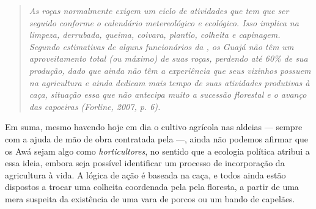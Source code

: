 \begin{quote}
\emph{As roças normalmente exigem um ciclo de atividades que tem que ser
seguido conforme o calendário metereológico e ecológico. Isso implica na
limpeza, derrubada, queima, coivara, plantio, colheita e capinagem.
Segundo estimativas de alguns funcionários da , os Guajá não têm um
aproveitamento total (ou máximo) de suas roças, perdendo até 60\% de sua
produção, dado que ainda não têm a experiência que seus vizinhos possuem
na agricultura e ainda dedicam mais tempo de suas atividades produtivas
à caça, situação essa que não antecipa muito a sucessão florestal e o
avanço das capoeiras (Forline, 2007, p. 6).}
\end{quote}

Em suma, mesmo havendo hoje em dia o cultivo agrícola nas aldeias ---
sempre com a ajuda de mão de obra contratada pela  ---, ainda não
podemos afirmar que os Awá sejam algo como \emph{horticultores}, no
sentido que a ecologia política atribui a essa ideia, embora seja
possível identificar um processo de incorporação da agricultura à vida.
A lógica de ação é baseada na caça, e todos ainda estão dispostos a
trocar uma colheita coordenada pela  pela floresta, a partir de uma
mera suspeita da existência de uma vara de porcos ou um bando de
capelães.

